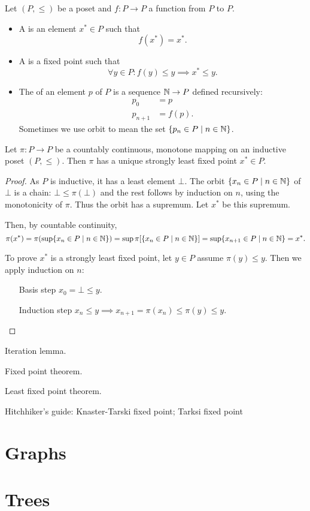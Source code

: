 \begin{definition}
Let $(P,\leq)$ be a poset and $f: P\to P$ a function from $P$ to $P$.
\begin{itemize}
\item A  is an element $x^*\in P$ such that
\[ f(x^*) = x^*. \]
\item A  is a fixed point such that
\[ \forall y\in P: f(y)\leq y \implies x^* \leq y. \]
\item The  of an element $p$ of $P$ is a sequence $\mathbb{N}\to P$ defined recursively:
\begin{align*}
p_0 &= p \\
p_{n+1} &= f(p).
\end{align*}
Sometimes we use orbit to mean the set $\{p_n\in P\;|\; n\in \mathbb{N}\}$.
\end{itemize}
\end{definition}

\begin{theorem}
Let $\pi:P\to P$ be a countably continuous, monotone mapping on an inductive poset $(P,\leq)$. Then $\pi$ has a unique strongly least fixed point $x^*\in P$.
\end{theorem}
\begin{proof}
As $P$ is inductive, it has a least element $\bot$. The orbit $\{x_n\in P\;|\; n\in \mathbb{N}\}$ of $\bot$ is a chain: $\bot \leq \pi(\bot)$ and the rest follows by induction on $n$, using the monotonicity of $\pi$. Thus the orbit has a supremum. Let $x^*$ be this supremum.

Then, by countable continuity,
\[ \pi(x^*) = \pi(\sup\{x_n\in P\;|\; n\in \mathbb{N}\}) = \sup\pi[\{x_n\in P\;|\; n\in \mathbb{N}\}] = \sup\{x_{n+1}\in P\;|\; n\in \mathbb{N}\} = x^*. \]

To prove $x^*$ is a strongly least fixed point, let $y\in P$ assume $\pi(y)\leq y$. Then we apply induction on $n$:
\begin{itemize}[leftmargin=3cm]
\item[Basis step] $x_0 = \bot \leq y$.
\item[Induction step] $x_n \leq y \implies x_{n+1} = \pi(x_n)\leq \pi(y) \leq y$.
\end{itemize}
\end{proof}

Iteration lemma.

Fixed point theorem.

Least fixed point theorem.

Hitchhiker's guide:
Knaster-Tarski fixed point; Tarksi fixed point

\chapter{Graphs}
\chapter{Trees}